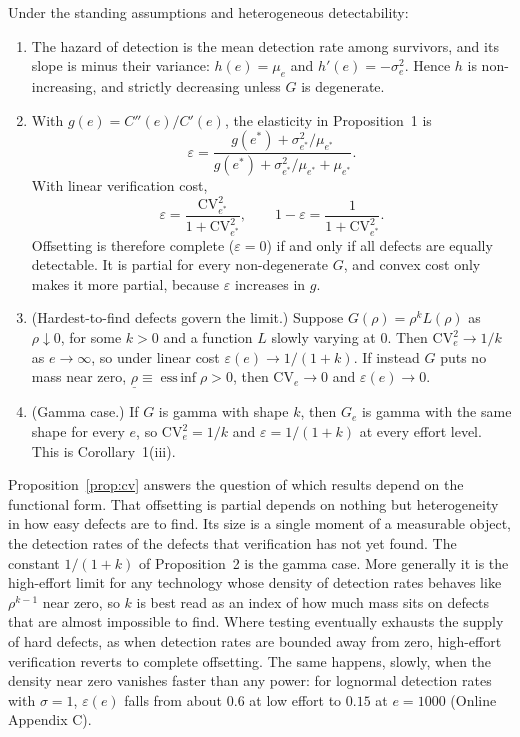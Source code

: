 \begin{proposition}
\label{prop:cv}
Under the standing assumptions and heterogeneous detectability:
\begin{enumerate}
\item[(a)] The hazard of detection is the mean detection rate among survivors, and
  its slope is minus their variance: $h(e)=\mu_e$ and $h'(e)=-\sigma_e^2$. Hence
  $h$ is non-increasing, and strictly decreasing unless $G$ is degenerate.
\item[(b)] With $g(e)=C''(e)/C'(e)$, the elasticity in Proposition~1 is
  \[
    \varepsilon=\frac{g(e^*)+\sigma_{e^*}^2/\mu_{e^*}}
                     {g(e^*)+\sigma_{e^*}^2/\mu_{e^*}+\mu_{e^*}} .
  \]
  With linear verification cost,
  \[
    \varepsilon=\frac{\mathrm{CV}_{e^*}^2}{1+\mathrm{CV}_{e^*}^2},
    \qquad
    1-\varepsilon=\frac{1}{1+\mathrm{CV}_{e^*}^2}.
  \]
  Offsetting is therefore complete ($\varepsilon=0$) if and only if all defects are
  equally detectable. It is partial for every non-degenerate $G$, and convex cost
  only makes it more partial, because $\varepsilon$ increases in $g$.
\item[(c)] (Hardest-to-find defects govern the limit.) Suppose
  $G(\rho)=\rho^{k}L(\rho)$ as $\rho\downarrow 0$, for some $k>0$ and a function $L$
  slowly varying at $0$. Then $\mathrm{CV}_e^2\to 1/k$ as $e\to\infty$, so under linear
  cost $\varepsilon(e)\to 1/(1+k)$. If instead $G$ puts no mass near zero,
  $\underline\rho\equiv\operatorname{ess\,inf}\rho>0$, then $\mathrm{CV}_e\to 0$ and
  $\varepsilon(e)\to 0$.
\item[(d)] (Gamma case.) If $G$ is gamma with shape $k$, then $G_e$ is gamma with the
  same shape for every $e$, so $\mathrm{CV}_e^2=1/k$ and $\varepsilon=1/(1+k)$ at every
  effort level. This is Corollary~1(iii).
\end{enumerate}
\end{proposition}

Proposition~\ref{prop:cv} answers the question of which results depend on the
functional form. That offsetting is partial depends on nothing but heterogeneity in
how easy defects are to find. Its size is a single moment of a measurable object, the
detection rates of the defects that verification has not yet found. The constant
$1/(1+k)$ of Proposition~2 is the gamma case. More generally it is the high-effort
limit for any technology whose density of detection rates behaves like
$\rho^{k-1}$ near zero, so $k$ is best read as an index of how much mass sits on
defects that are almost impossible to find. Where testing eventually exhausts the
supply of hard defects, as when detection rates are bounded away from zero,
high-effort verification reverts to complete offsetting. The same happens, slowly,
when the density near zero vanishes faster than any power: for lognormal detection rates
with $\sigma=1$, $\varepsilon(e)$ falls from about $0.6$ at low effort to $0.15$ at
$e=1000$ (Online Appendix C).


